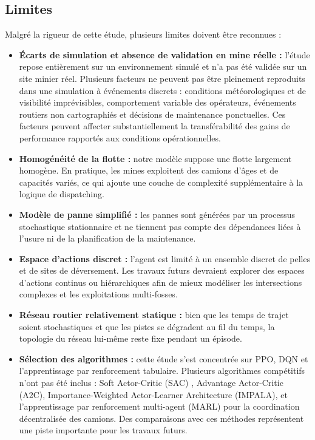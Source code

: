 \documentclass[11pt,a4paper]{article}
\begin{document}
\subsection{Limites}
\label{sec:limitations}

Malgré la rigueur de cette étude, plusieurs limites doivent être reconnues :

\begin{itemize}
  \item \textbf{Écarts de simulation et absence de validation en mine réelle :} l'étude repose entièrement sur un environnement simulé et n'a pas été validée sur un site minier réel. Plusieurs facteurs ne peuvent pas être pleinement reproduits dans une simulation à événements discrets : conditions météorologiques et de visibilité imprévisibles, comportement variable des opérateurs, événements routiers non cartographiés et décisions de maintenance ponctuelles. Ces facteurs peuvent affecter substantiellement la transférabilité des gains de performance rapportés aux conditions opérationnelles.
  \item \textbf{Homogénéité de la flotte :} notre modèle suppose une flotte largement homogène. En pratique, les mines exploitent des camions d'âges et de capacités variés, ce qui ajoute une couche de complexité supplémentaire à la logique de dispatching.
  \item \textbf{Modèle de panne simplifié :} les pannes sont générées par un processus stochastique stationnaire et ne tiennent pas compte des dépendances liées à l'usure ni de la planification de la maintenance.
  \item \textbf{Espace d'actions discret :} l'agent est limité à un ensemble discret de pelles et de sites de déversement. Les travaux futurs devraient explorer des espaces d'actions continus ou hiérarchiques afin de mieux modéliser les intersections complexes et les exploitations multi-fosses.
  \item \textbf{Réseau routier relativement statique :} bien que les temps de trajet soient stochastiques et que les pistes se dégradent au fil du temps, la topologie du réseau lui-même reste fixe pendant un épisode.
  \item \textbf{Sélection des algorithmes :} cette étude s'est concentrée sur PPO, DQN et l'apprentissage par renforcement tabulaire. Plusieurs algorithmes compétitifs n'ont pas été inclus : Soft Actor-Critic (SAC) \cite{Haarnoja2018, SampsonNwachukwu2025}, Advantage Actor-Critic (A2C), Importance-Weighted Actor-Learner Architecture (IMPALA), et l'apprentissage par renforcement multi-agent (MARL) \cite{Zhao2025} pour la coordination décentralisée des camions. Des comparaisons avec ces méthodes représentent une piste importante pour les travaux futurs.

\end{itemize}
\end{document}
